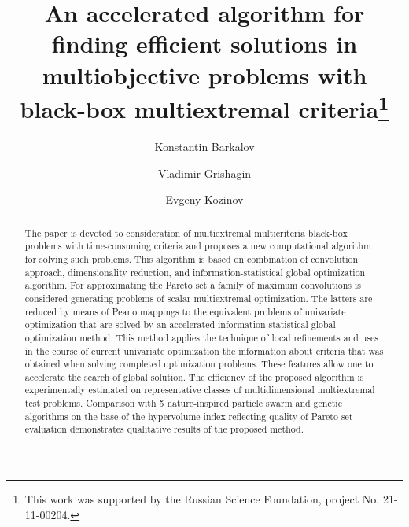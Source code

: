 \documentclass[runningheads]{llncs}
\begin{document}
%
\title{An accelerated algorithm for finding efficient solutions in multiobjective problems with black-box multiextremal criteria\thanks{This work was supported by the Russian Science Foundation, project No. 21-11-00204.}}
%
%
\author{Konstantin Barkalov \and
Vladimir Grishagin \and
Evgeny Kozinov}
%
%

%
\maketitle              %
%
\begin{abstract}
The paper is devoted to consideration of multiextremal multicriteria black-box problems with time-consuming criteria and proposes a new computational algorithm for solving such problems. This algorithm is based on combination of convolution approach, dimensionality reduction, and information-statistical global optimization algorithm. For approximating the Pareto set a family of maximum convolutions is considered generating problems of scalar multiextremal optimization. The latters are reduced by means of Peano mappings to the equivalent problems of univariate optimization that are solved by an accelerated information-statistical global optimization method. This method applies the technique of local refinements and uses in the course of current univariate optimization the information about criteria that was obtained when solving completed optimization problems. These features allow one to accelerate the search of global solution.  
The efficiency of the proposed algorithm is experimentally estimated on representative classes of multidimensional multiextremal test problems. Comparison with 5 nature-inspired particle swarm and genetic algorithms on the base of the hypervolume index reflecting quality of Pareto set evaluation demonstrates qualitative results of the proposed method.

\end{abstract}
%
%
%
\end{document}
